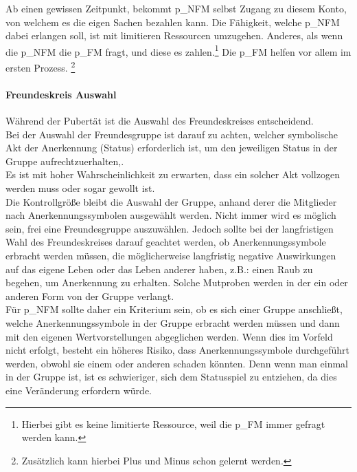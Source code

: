 Ab einen gewissen Zeitpunkt, bekommt \gls{p_NFM} selbst Zugang zu diesem Konto, von welchem es die eigen Sachen bezahlen kann. Die Fähigkeit, welche \gls{p_NFM} dabei erlangen soll, ist mit limitieren Ressourcen umzugehen. Anderes, als wenn die \gls{p_NFM} die \gls{p_FM} fragt, und diese es zahlen.\footnote{
	Hierbei gibt es keine limitierte Ressource, weil die \gls{p_FM} immer gefragt werden kann.
} Die \gls{p_FM} helfen vor allem im ersten Prozess. \footnote{
	Zusätzlich kann hierbei Plus und Minus schon gelernt werden.
}

\paragraph{Freundeskreis Auswahl}

Während der Pubertät ist die Auswahl des Freundeskreises entscheidend.\\


Bei der Auswahl der Freundesgruppe ist darauf zu achten, welcher symbolische Akt der Anerkennung (Status) erforderlich ist, um den jeweiligen Status in der Gruppe aufrechtzuerhalten,.\\


Es ist mit hoher Wahrscheinlichkeit zu erwarten, dass ein solcher Akt vollzogen werden muss oder sogar gewollt ist.\\


Die Kontrollgröße bleibt die Auswahl der Gruppe, anhand derer die Mitglieder nach Anerkennungssymbolen ausgewählt werden. Nicht immer wird es möglich sein, frei eine Freundesgruppe auszuwählen. Jedoch sollte bei der langfristigen Wahl des Freundeskreises darauf geachtet werden, ob Anerkennungssymbole erbracht werden müssen, die möglicherweise langfristig negative Auswirkungen auf das eigene Leben oder das Leben anderer haben, z.B.: einen Raub zu begehen, um Anerkennung zu erhalten. Solche Mutproben werden in der ein oder anderen Form von der Gruppe verlangt.\\


Für \gls{p_NFM} sollte daher ein Kriterium sein, ob es sich einer Gruppe anschließt, welche Anerkennungssymbole in der Gruppe erbracht werden müssen und dann mit den eigenen Wertvorstellungen abgeglichen werden. Wenn dies im Vorfeld nicht erfolgt, besteht ein höheres Risiko, dass Anerkennungssymbole durchgeführt werden, obwohl sie einem oder anderen schaden könnten. Denn wenn man einmal in der Gruppe ist, ist es schwieriger, sich dem Statusspiel zu entziehen, da dies eine Veränderung erfordern würde.\\


